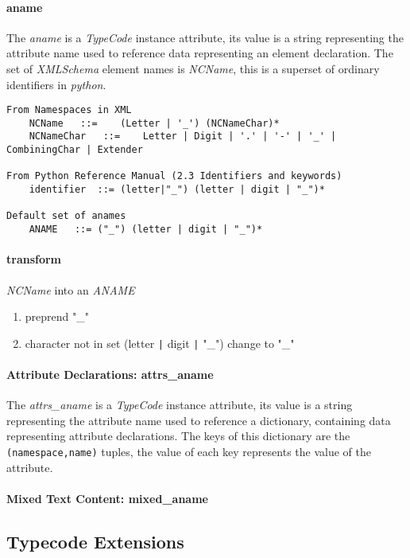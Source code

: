 \paragraph{aname}
The {\it aname} is a {\it TypeCode} instance attribute, its value is a string representing the
attribute name used to reference data representing an element declaration. The set 
of {\it XMLSchema} element names is {\it NCName}, this is a superset of ordinary
 identifiers in {\it python}.


\begin{verbatim}
From Namespaces in XML
	NCName	 ::=	(Letter | '_') (NCNameChar)*
	NCNameChar	 ::=	Letter | Digit | '.' | '-' | '_' | CombiningChar | Extender

From Python Reference Manual (2.3 Identifiers and keywords)
	identifier	::=	(letter|"_") (letter | digit | "_")*

Default set of anames
	ANAME	::=	("_") (letter | digit | "_")*
\end{verbatim}

\paragraph{transform} {\it NCName} into an {\it ANAME}
\begin{enumerate}
\item preprend "_"
\item character not in set (letter \verb!|! digit \verb!|! "_") change to "_"
\end{enumerate}

\paragraph{Attribute Declarations: attrs_aname}
The {\it attrs_aname} is a {\it TypeCode} instance attribute, its value is a string representing the
attribute name used to reference a dictionary, containing data representing
attribute declarations.  The keys of this dictionary are the
\verb!(namespace,name)! tuples, the value of each key represents the value of
the attribute.


\paragraph{Mixed Text Content: mixed_aname}

\subsection{Typecode Extensions}

